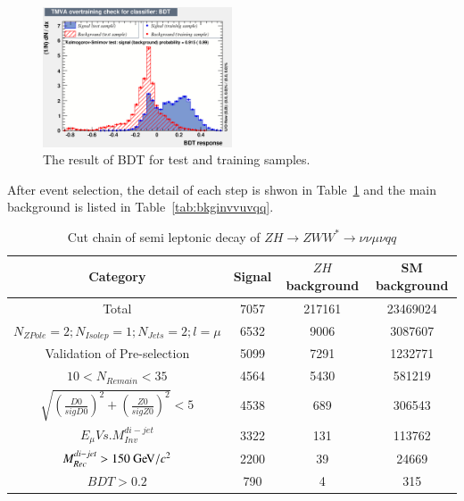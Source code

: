 \documentclass[11pt,a4paper]{cepcnote}
\begin{document}
\begin{figure}[H]
	\centering
	\includegraphics[width=0.5\textwidth]{nnH/lvqq/uvqq/overtrain_BDT}
	\caption[]{The result of BDT for test and training samples.}
	\label{fig:nnHuvqqbdt}
\end{figure}

After event selection, the detail of each step is shwon in Table~\ref{tab:cutchainvvuvqq} and the main background is listed in 
Table~\ref{tab:bkginvvuvqq}.
\begin{table}[H]
  \begin{center}
    \begin{tabular}{cccc}
      \hline \hline
      \multicolumn{1}{c}{Category}&\multicolumn{1}{c}{Signal}&\multicolumn{1}{c}{$ZH$ background}&\multicolumn{1}{c}{SM background}\\ 
      \hline
      Total 	      	 									&   7057	& 217161& 23469024	\\
	  $N_{ZPole}=2; N_{Isolep}=1; N_{Jets} =2; l = \mu$		&   6532	& 9006	& 3087607	\\
	  Validation of Pre-selection							&	5099	& 7291	& 1232771	\\
	  $10 < N_{Remain} < 35$								&	4564	& 5430	& 581219	\\
	  $\sqrt{(\frac{D0}{sigD0})^2+(\frac{Z0}{sigZ0})^2} < 5$&	4538	& 689	& 306543	\\
	  $E_{\mu} Vs. M_{Inv}^{di-jet}$						&	3322	& 131	& 113762	\\
	  $M_{Rec}^{di-jet} > 150\gev/c^2$						&   2200	& 39	& 24669		\\
	  $BDT >0.2$											&   790  	& 4 	& 315		\\
      \hline \hline
    \end{tabular}
  \caption[Monte Carlo purities in the single lepton sample]{%
    Cut chain of semi leptonic decay of $ZH\rightarrow ZWW^* \rightarrow \nu\nu\mu\nu qq$}
  \label{tab:cutchainvvuvqq}
  \end{center}
\end{table}
\end{document}
